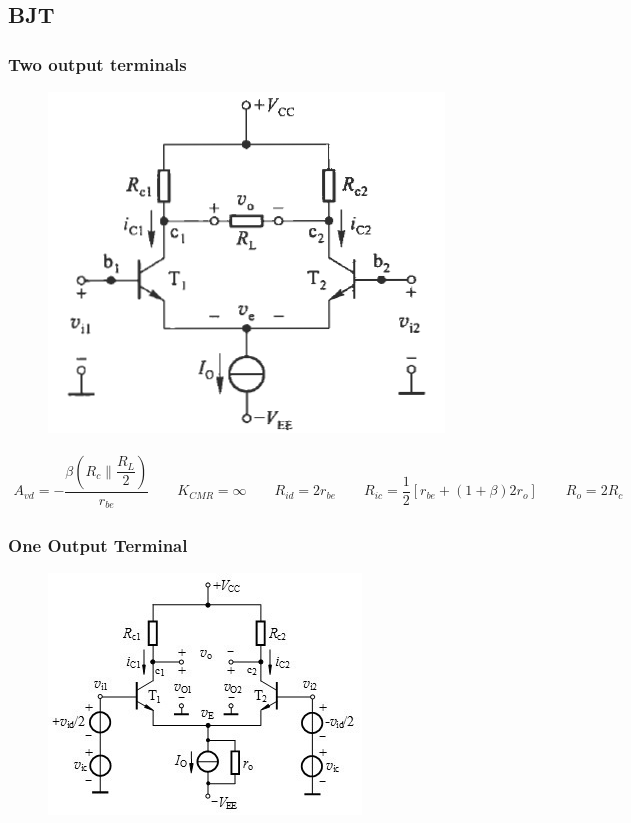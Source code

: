 \subsection{BJT}

\subsubsection{Two output terminals}

\begin{figure}[H]
  \centering
  \includegraphics[width=0.7\linewidth]{figures/Differential-Amplifier-BJT-1}
\end{figure}

\begin{equation*}
  \begin{aligned}
    A_{vd} = - \dfrac{\beta \left( R_c \parallel \dfrac{R_L}{2} \right)}{r_{be}} \quad\quad K_{CMR} = \infty \quad\quad R_{id} = 2 r_{be} \quad\quad R_{ic} = \dfrac{1}{2} \left[ r_{be} + \left( 1 + \beta \right) 2 r_o \right] \quad\quad R_o = 2 R_c
  \end{aligned}
\end{equation*}

\subsubsection{One Output Terminal}

\begin{figure}[H]
  \centering
  \includegraphics[width=0.7\linewidth]{figures/Differential-Amplifier-BJT-2}
\end{figure}

